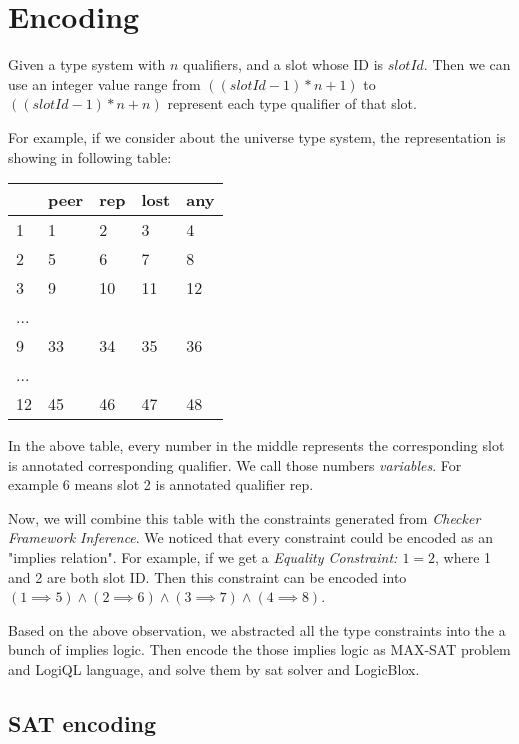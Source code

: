 \documentclass[11pt]{article}
\begin{document}
\section{Encoding}
\par Given a type system with $n$ qualifiers, and a slot whose ID is $slotId$. Then we can use an integer value range from $((slotId - 1) * n + 1)$ to $((slotId - 1) * n + n)$ represent each type qualifier of that slot.
\par For example, if we consider about the universe type system, the representation is showing in following table:

\begin{center}
\begin{tabular}{|l|l|l|l|l|}\hline
	\backslashbox{$SlotId$}{$Qualifier$} & peer & rep & lost & any\\
	\hline
	1 & 1 & 2 & 3 & 4\\
	\hline
	2 & 5 & 6 & 7 & 8\\
	\hline
	3 & 9 & 10 & 11 & 12\\
	\hline
	... &  &  &  & \\
	\hline
	9 & 33 & 34 & 35 & 36\\
	\hline
	... & & & &\\
	\hline
	12 & 45 & 46 & 47 & 48\\
	\hline
\end{tabular}
\end{center}
\par In the above table, every number in the middle represents the corresponding slot is annotated corresponding qualifier. We call those numbers \textit{variables}. For example $6$ means slot 2 is annotated qualifier rep.
\par Now, we will combine this table with the constraints generated from \textit{Checker Framework Inference}. We noticed that every constraint could be encoded as an "implies relation". For example, if we get a \textit{Equality Constraint: $1 = 2$}, where 1 and 2 are both slot ID. Then this constraint can be encoded into $(1 \implies 5) \wedge (2 \implies 6) \wedge (3 \implies 7) \wedge (4 \implies 8)$.
\par Based on the above observation, we abstracted all the type constraints into the a bunch of implies logic. Then encode the those implies logic as MAX-SAT problem and LogiQL language, and solve them by sat solver and LogicBlox.   

\subsection{SAT encoding}
\end{document}
